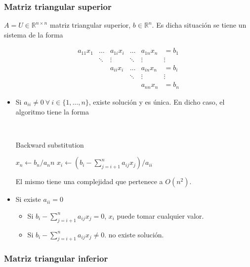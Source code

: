 \subsubsection{Matriz triangular superior}
\label{subsubsec:matriz_triangular_superior}

$A = U \in \mathbb{R}^{n \times n}$ matriz triangular superior, $b \in \mathbb{R}^{n}$. Es dicha situación se tiene un sistema de la forma

\[
\begin{matrix}
a_{11}x_{1} & \ldots & a_{1i}x_i & \ldots & a_{1n}x_n & = b_1 \\
 & \ddots & \vdots & \ddots & \vdots & \vdots \\
 & & a_{ii}x_{i} & \ldots & a_{in}x_n & = b_{i} \\
 & &  & \ddots & \vdots & \vdots \\
 & & & & a_{nn}x_n & = b_n
\end{matrix}
\]

\begin{itemize}
    \item Si $a_{ii} \neq 0 ~\forall~ i \in \{1,\ldots,n\}$, existe solución y es única. En dicho caso, el algoritmo tiene la forma
    
    \
    \begin{algorithm}
    \begin{algorithmic}
    \caption{Backward substitution}
    \label{alg:backward_substitution}
    \State $x_n \gets b_n/a_nn $
        \State $x_i \gets (b_i - \sum_{j=i+1}^{n} a_{ij}x_j)/a_{ii}$
    \EndFor
    \end{algorithmic}
    \end{algorithm}
    
    El mismo tiene una complejidad que pertenece a $O(n^2)$.
    
    \item Si existe $a_{ii} = 0$
    \begin{itemize}
        \item Si $b_{i} - \sum_{j=i+1}^{n} a_{ij}x_j = 0$, $x_i$ puede tomar cualquier valor.
        \item Si $b_{i} - \sum_{j=i+1}^{n} a_{ij}x_j \neq 0$. no existe solución.
    \end{itemize}
\end{itemize}

\subsubsection{Matriz triangular inferior}
\label{subsubsec:matriz_triangular_inferior}

